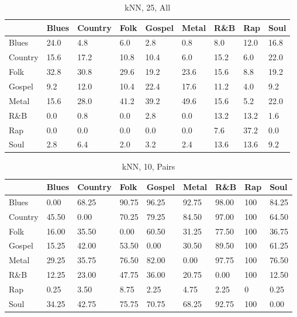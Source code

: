 \documentclass[a4paper,oneside]{article}
\begin{document}
\begin{table}[H]\centering
\caption{kNN, 25, All}
\begin{tabu}{l|*{8}{l}}
 & Blues & Country & Folk & Gospel & Metal & R\&B & Rap & Soul \\ \hline
Blues & 24.0 & 4.8 & 6.0 & 2.8 & 0.8 & 8.0 & 12.0 & 16.8 \\
Country & 15.6 & 17.2 & 10.8 & 10.4 & 6.0 & 15.2 & 6.0 & 22.0 \\
Folk & 32.8 & 30.8 & 29.6 & 19.2 & 23.6 & 15.6 & 8.8 & 19.2 \\
Gospel & 9.2 & 12.0 & 10.4 & 22.4 & 17.6 & 11.2 & 4.0 & 9.2 \\
Metal & 15.6 & 28.0 & 41.2 & 39.2 & 49.6 & 15.6 & 5.2 & 22.0 \\
R\&B & 0.0 & 0.8 & 0.0 & 2.8 & 0.0 & 13.2 & 13.2 & 1.6 \\
Rap & 0.0 & 0.0 & 0.0 & 0.0 & 0.0 & 7.6 & 37.2 & 0.0 \\
Soul & 2.8 & 6.4 & 2.0 & 3.2 & 2.4 & 13.6 & 13.6 & 9.2 \\
\end{tabu}
\end{table}

\begin{table}[H]\centering
\caption{kNN, 10, Pairs}
\begin{tabu}{l|*{8}{l}}
 & Blues & Country & Folk & Gospel & Metal & R\&B & Rap & Soul \\ \hline
Blues & 0.00 & 68.25 & 90.75 & 96.25 & 92.75 & 98.00 & 100 & 84.25 \\
Country & 45.50 & 0.00 & 70.25 & 79.25 & 84.50 & 97.00 & 100 & 64.50 \\
Folk & 16.00 & 35.50 & 0.00 & 60.50 & 31.25 & 77.50 & 100 & 36.75 \\
Gospel & 15.25 & 42.00 & 53.50 & 0.00 & 30.50 & 89.50 & 100 & 61.25 \\
Metal & 29.25 & 35.75 & 76.50 & 82.00 & 0.00 & 97.75 & 100 & 76.50 \\
R\&B & 12.25 & 23.00 & 47.75 & 36.00 & 20.75 & 0.00 & 100 & 12.50 \\
Rap & 0.25 & 3.50 & 8.75 & 2.25 & 4.75 & 2.25 & 0 & 0.25 \\
Soul & 34.25 & 42.75 & 75.75 & 70.75 & 68.25 & 92.75 & 100 & 0.00 \\
\end{tabu}
\end{table}
\end{document}

